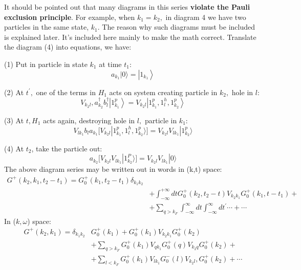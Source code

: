 It should be pointed out that many diagrams in this series \textbf{violate the Pauli exclusion principle}. For example, when $k_{1}=k_{2},$ in diagram 4 we have two particles in the same state, $k_{1}$. The reason why such diagrams must be included is explained later. It's included here mainly to make the math correct. Translate the diagram (4) into equations, we have:

(1) Put in particle in state $k_1$ at time $t_1$:
$$a_{k_{1}}|0\rangle=\left|1_{k_{1}}\right\rangle$$

(2) At $t^{\prime},$ one of the terms in $H_{1}$ acts on system creating particle in $k_{2},$ hole in $l:$
$$V_{k_{2}l}, a^{\dagger}_{k_{2}} b_{l}^{\dagger}\left|1^p_{k_1}\right\rangle=V_{k_{2}l} \left| 1^p_{k_{1}}, 1^h_l, 1^p_{k_2}\right\rangle$$

(3) At $t, H_{1}$ acts again, destroying hole in $l,$ particle in $k_{1}$:
$$
V_{lk_1}b_la_{k_1}[V_{k_2l}| 1^p_{k_{1}}, 1^h_l, 1^p_{k_2}\rangle]=V_{k_2l}V_{lk_1}|1^p_{k_2}\rangle
$$

(4) At $t_2$, take the particle out:
$$
a_{k_2}[V_{k_2l}V_{lk_1}|1^P_{k_2}\rangle]=V_{k_2l}V_{lk_1}|0\rangle
$$
The above diagram series may be written out in words in (k,t) space:
\begin{equation}\begin{aligned}
G^{+}\left(k_{2}, k_{1}, t_{2}-t_{1}\right)=G_{0}^{+}\left(k_{1}, t_{2}-t_{1}\right) \delta_{k_{1}k_{2}}  \\
&+\int_{-\infty}^{+\infty} d t G_{0}^{+}\left(k_{2}, t_{2}-t\right) V_{k_{2} k_{1}} G_{0}^{+}\left(k_{1}, t-t_{1}\right)+\\
&+\sum_{q>k_{F}} \int_{-\infty}^{\infty} d t \int_{-\infty}^{\infty} d t^{\prime} \cdots+\cdots
\end{aligned}\end{equation}
In ($k,\omega$) space:
\begin{equation}\begin{array}{rl}
G^{+}\left(k_{2}, k_{1}\right)=\delta_{k_{1}k_{2}} &  G_{0}^{+}\left(k_{1}\right)+G_{0}^{+}\left(k_{1}\right) V_{k_{2} k_{1}} G_{0}^{+}\left(k_{2}\right) \\
& +\sum_{q>k_{F}} G_{0}^{+}\left(k_{1}\right) V_{q k_{1}} G_{0}^{+}(q) V_{k_{2} q} G_{0}^{+}\left(k_{2}\right)+ \\
& +\sum_{l<k_{F}} G_{0}^{+}\left(k_{1}\right) V_{l k_{1}} G_{0}^{-}(l) V_{k_{2}l}, G_{0}^{+}\left(k_{2}\right)+\cdots
\end{array}\end{equation}